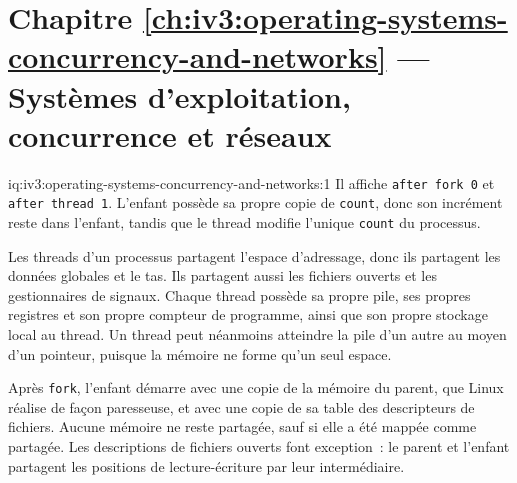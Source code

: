 \section*{Chapitre \ref{ch:iv3:operating-systems-concurrency-and-networks} --- Systèmes d'exploitation, concurrence et réseaux}

\begin{solution}{iq:iv3:operating-systems-concurrency-and-networks:1}
Il affiche \texttt{after fork 0} et \texttt{after thread 1}. L'enfant possède sa propre copie de \texttt{count}, donc son incrément reste dans l'enfant, tandis que le thread modifie l'unique \texttt{count} du processus.

Les threads d'un processus partagent l'espace d'adressage, donc ils partagent les données globales et le tas. Ils partagent aussi les fichiers ouverts et les gestionnaires de signaux. Chaque thread possède sa propre pile, ses propres registres et son propre compteur de programme, ainsi que son propre stockage local au thread. Un thread peut néanmoins atteindre la pile d'un autre au moyen d'un pointeur, puisque la mémoire ne forme qu'un seul espace.

Après \texttt{fork}, l'enfant démarre avec une copie de la mémoire du parent, que Linux réalise de façon paresseuse, et avec une copie de sa table des descripteurs de fichiers. Aucune mémoire ne reste partagée, sauf si elle a été mappée comme partagée. Les descriptions de fichiers ouverts font exception~: le parent et l'enfant partagent les positions de lecture-écriture par leur intermédiaire.

\end{solution}

